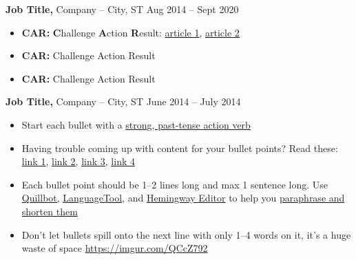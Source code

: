 \documentclass[11pt]{article}       %
\begin{document}
\textbf{Job Title,} {Company} -- City, ST \hfill Aug 2014 -- Sept 2020 \\
\vspace{-9pt}
\begin{itemize}
  \item \textbf{CAR:} \textbf{C}hallenge \textbf{A}ction \textbf{R}esult: \href{https://ca.indeed.com/career-advice/resumes-cover-letters/challenge-action-result-resume}{\underline{article 1}}, \href{https://www.topresume.com/career-advice/how-to-get-more-results-with-a-car-resume}{\underline{article 2}}
  \item \textbf{CAR:} Challenge Action Result
  \item \textbf{CAR:} Challenge Action Result
\end{itemize}

\textbf{Job Title,} {Company} -- City, ST \hfill June 2014 -- July 2014 \\
\vspace{-9pt}
\begin{itemize}
  \item Start each bullet with a \href{https://old.reddit.com/r/EngineeringResumes/wiki/index\#wiki_action_verbs}{\underline{strong, past-tense action verb}}
  \item Having trouble coming up with content for your bullet points? Read these: \href{https://old.reddit.com/r/EngineeringResumes/wiki/index\#wiki_having_trouble_coming_up_with_content_for_your_bullet_points.3F_ask_yourself_the_following_questions.3A}{\underline{link 1}}, \href{https://old.reddit.com/r/EngineeringResumes/wiki/index\#wiki_got_writer.27s_block_from_looking_at_star.2Fcar.2Fxyz.3F}{\underline{link 2}}, \href{https://archive.ph/Xmdqt}{\underline{link 3}}, \href{https://old.reddit.com/r/EngineeringResumes/wiki/sample-bullet-points}{\underline{link 4}}
  \item Each bullet point should be 1--2 lines long and max 1 sentence long. Use \href{https://quillbot.com/}{\underline{Quillbot}}, \href{https://languagetool.org/paraphrasing-tool}{\underline{LanguageTool}}, and \href{https://hemingwayapp.com/}{\underline{Hemingway Editor}} to help you \href{https://www.youtube.com/watch?v=VvPaEsuz-tY}{paraphrase and shorten them}
  \item Don't let bullets spill onto the next line with only 1--4 words on it, it's a huge waste of space \url{https://imgur.com/QCcZ792}
\end{itemize}

\end{document}
